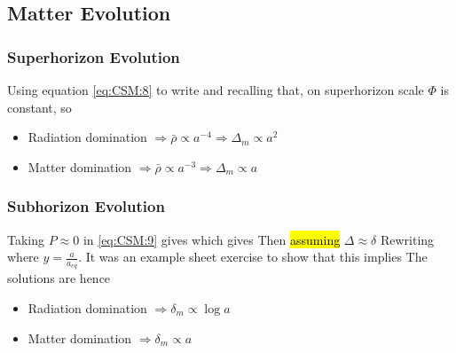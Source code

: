 \documentclass{article}
\begin{document}
\subsection{Matter Evolution}

\subsubsection*{Superhorizon Evolution} 
Using equation \ref{eq:CSM:8} to write 
and recalling that, on superhorizon scale $\Phi$ is constant, so 
\begin{itemize}
    \item Radiation domination $\Rightarrow \bar{\rho} \propto a^{-4} \Rightarrow \Delta_m \propto a^2$
    \item Matter domination $\Rightarrow \bar{\rho} \propto a^{-3} \Rightarrow \Delta_m \propto a$
\end{itemize}


\subsubsection*{Subhorizon Evolution} 
Taking $P\approx 0$ in \ref{eq:CSM:9} gives 
which gives 
Then \hl{assuming} $\Delta \approx \delta $ 
Rewriting 
where $y = \frac{a}{a_{eq}}$. It was an example sheet exercise to show that this implies 
The solutions are 
hence 
\begin{itemize}
    \item Radiation domination $ \Rightarrow \delta_m \propto \log a$ 
    \item Matter domination $ \Rightarrow \delta_m \propto a$
\end{itemize}
\end{document}
